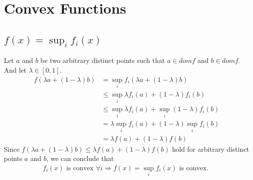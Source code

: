 \documentclass[11pt,a4paper]{article}
\begin{document}
\newpage
\section{Convex Functions}
\subsection{$f(x) = \sup_i f_i (x)$}
Let $a$ and $b$ be two arbitrary distinct points such that $a \in dom f$ and $b \in dom f$. And
let $\lambda \in [0, 1]$.
\begin{align}
    f(\lambda a + (1-\lambda) b) 
    &= \sup_i f_i (\lambda a + (1-\lambda) b) \\
    &\leq \sup_i \lambda f_i (a) + (1-\lambda) f_i (b) \\
    &\leq \sup_i \lambda f_i (a) + \sup_i (1-\lambda) f_i (b) \\
    &= \lambda \sup_i  f_i (a) + (1-\lambda) \sup_i f_i (b) \\
    &= \lambda f(a) + (1-\lambda) f(b)
\end{align}
Since $ f(\lambda a + (1-\lambda) b) \leq \lambda f(a) + (1-\lambda) f(b)$
hold for arbitrary distinct points $a$ and $b$, we
can conclude that 
\begin{align}
    f_i(x) \text{ is convex } \forall i \Rightarrow f(x) = \sup_i f_i(x) \text{ is convex. }
\end{align}
\end{document}
